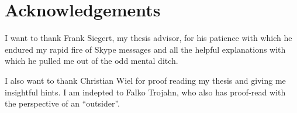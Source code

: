 \section*{Acknowledgements}

I want to thank Frank Siegert, my thesis advisor, for his patience
with which he endured my rapid fire of Skype messages and all the
helpful explanations with which he pulled me out of the odd mental
ditch.

I also want to thank Christian Wiel for proof reading my thesis and
giving me insightful hints. I am indepted to Falko Trojahn, who also
has proof-read with the perspective of an ``outsider''.

